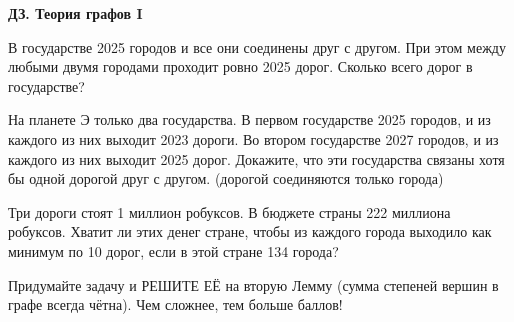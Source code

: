 \centerline{\bf \Huge ДЗ. Теория графов I}
\centerline{\bf \Huge }

 В государстве 2025 городов и все они соединены друг с другом. При этом между любыми двумя городами проходит ровно 2025 дорог. Сколько всего дорог в государстве?

 На планете Э только два государства. В первом государстве 2025 городов, и из каждого из них выходит 2023 дороги. Во втором государстве 2027 городов, и из каждого из них выходит 2025 дорог. Докажите, что эти государства связаны хотя бы одной дорогой друг с другом. (дорогой соединяются только города)

 Три дороги стоят 1 миллион робуксов. В бюджете страны 222 миллиона робуксов. Хватит ли этих денег стране, чтобы из каждого города выходило как минимум по 10 дорог, если в этой стране 134 города?

 Придумайте задачу и РЕШИТЕ ЕЁ на вторую Лемму (сумма степеней вершин в графе всегда чётна). Чем сложнее, тем больше баллов!